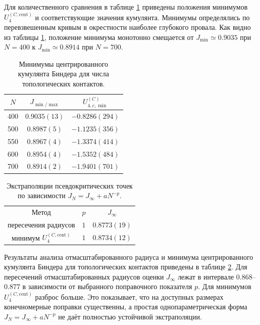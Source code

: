  
 Для количественного сравнения в таблице
 \ref{tab:xy3d_contacts_centered_minima} приведены положения минимумов
 $U_4^{(C,\mathrm{cent})}$ и соответствующие значения кумулянта. Минимумы
 определялись по перевзвешенным кривым в окрестности наиболее глубокого
 провала. Как видно из таблицы \ref{tab:xy3d_contacts_centered_minima}, положение
 минимума монотонно смещается от $J_{\min}\simeq 0.9035$ при $N=400$ к
 $J_{\min}\simeq 0.8914$ при $N=700$.  



\begin{table}[ht]
	\centering
	\caption{Минимумы центрированного кумулянта Биндера для числа топологических контактов.}
	\label{tab:xy3d_contacts_centered_minima}
	\begin{tabular}{|ccc|}
		\hline
		$N$ & $J_{\min/\max}$ & $U_{4,c,\min}^{(C)}$ \\
		\hline
		400 & $0.9035(13)$ & $-0.8286(294)$ \\
		500 & $0.8987(5)$  & $-1.1235(356)$ \\
		550 & $0.8967(4)$  & $-1.3374(414)$ \\
		600 & $0.8954(4)$  & $-1.5352(484)$ \\
		700 & $0.8914(2)$  & $-1.9401(701)$ \\
		\hline
	\end{tabular}
\end{table}

 
\begin{table}[ht]
	\centering
	\caption{Экстраполяции псевдокритических точек по зависимости
		$J_N = J_\infty + aN^{-p}$.}
	\label{tab:xy3d_shift_fits_reweight}
	\begin{tabular}{|ccc|}
		\hline
		Метод & $p$ & $J_\infty$ \\
		пересечения радиусов & $1$ & $0.8773(19)$ \\
		минимум $U_4^{(C,\mathrm{cent})}$ & $1$ & $0.8734(12)$ \\
		\hline
	\end{tabular}
\end{table}
 
 Результаты анализа  отмасштабированного радиуса и минимума центрированного кумулянта Биндера для топологических контактов приведены в таблице
 \ref{tab:xy3d_shift_fits_reweight}. 
 Для пересечений отмасштабированных
 радиусов оценки $J_\infty$ лежат в интервале $0.868$--$0.877$ в зависимости
 от выбранного поправочного показателя $p$. 
 Для минимумов
 $U_4^{(C,\mathrm{cent})}$ разброс больше. 
 Это показывает, что
 на доступных размерах конечномерные поправки существенны, а простая
 однопараметрическая форма $J_N=J_\infty+aN^{-p}$ не даёт полностью устойчивой экстраполяции.
   
